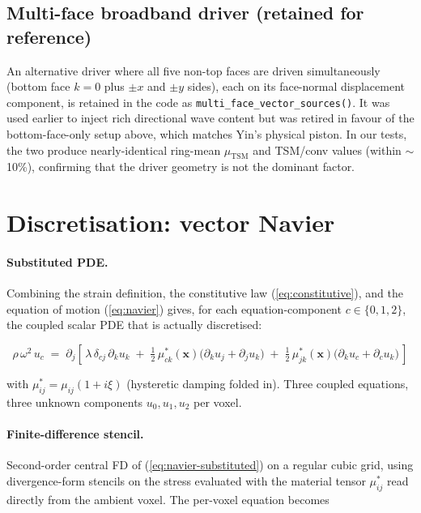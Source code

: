 \documentclass[11pt,letterpaper]{article}
\newcommand{\vect}[1]{\boldsymbol{#1}}
\begin{document}
\subsection{Multi-face broadband driver (retained for reference)}
\label{sec:driver-multiface}
An alternative driver where all five non-top faces are driven simultaneously
(bottom face $k=0$ plus $\pm x$ and $\pm y$ sides), each on its face-normal
displacement component, is retained in the code as \texttt{multi\_face\_vector\_sources()}.
It was used earlier to inject rich directional wave content but was
retired in favour of the bottom-face-only setup above, which matches
Yin's physical piston. In our tests, the two produce nearly-identical
ring-mean $\mu_{\text{TSM}}$ and TSM/conv values (within $\sim$10\%),
confirming that the driver geometry is not the dominant factor.

\section{Discretisation: vector Navier}
\label{sec:discretisation}

\paragraph{Substituted PDE.}
Combining the strain definition, the constitutive law
(\ref{eq:constitutive}), and the equation of motion (\ref{eq:navier})
gives, for each equation-component $c \in \{0,1,2\}$, the coupled
scalar PDE that is actually discretised:

\begin{equation}
\boxed{\;
\rho\,\omega^{2}\,u_{c} \;=\;
\partial_{j}\!\left[\,
   \lambda\,\delta_{cj}\,\partial_{k} u_{k}
   \;+\; \tfrac{1}{2}\,\mu^{*}_{ck}(\vect x)\bigl(\partial_{k}u_{j}+\partial_{j}u_{k}\bigr)
   \;+\; \tfrac{1}{2}\,\mu^{*}_{jk}(\vect x)\bigl(\partial_{k}u_{c}+\partial_{c}u_{k}\bigr)
\,\right]
\;}
\label{eq:navier-substituted}
\end{equation}

with $\mu^{*}_{ij} = \mu_{ij}(1+i\xi)$ (hysteretic damping folded
in). Three coupled equations, three unknown components
$u_{0}, u_{1}, u_{2}$ per voxel.

\paragraph{Finite-difference stencil.}
Second-order central FD of (\ref{eq:navier-substituted}) on a regular
cubic grid, using divergence-form stencils on the stress evaluated
with the material tensor $\mu_{ij}^{*}$ read directly from the
ambient voxel. The per-voxel equation becomes
\end{document}
